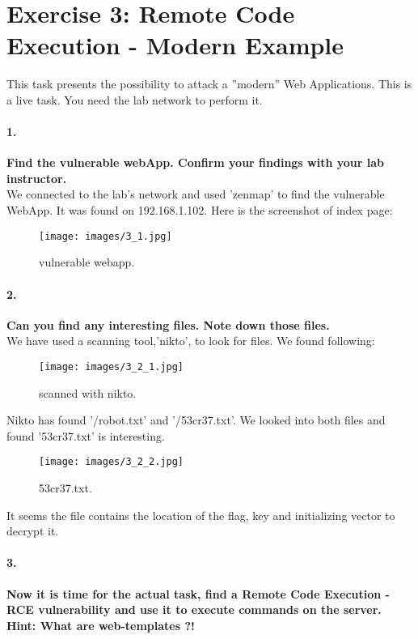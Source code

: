 \documentclass[12pt]{report}
\begin{document}
	
	\section*{Exercise 3: Remote Code Execution - Modern Example}
	
	This task presents the possibility to attack a ''modern'' Web Applications. This is a live task. You need the lab	network to perform it.
	
	\paragraph*{1.}{\bf Find the vulnerable webApp. Confirm your findings with your lab instructor.}\\
	
	We connected to the lab's network and used 'zenmap' to find the vulnerable WebApp. It was found on 192.168.1.102. Here is the screenshot of index page:
	
	\begin{figure}[H]
		\texttt{[image: images/3\_1.jpg]}
		\caption{vulnerable webapp.}
	\end{figure}
	
	\paragraph*{2.}{\bf Can you find any interesting files. Note down those files.}\\
	
	We have used a scanning tool,'nikto', to look for files. We found following:
	
	\begin{figure}[H]
		\texttt{[image: images/3\_2\_1.jpg]}
		\caption{scanned with nikto.}
	\end{figure}
	
	Nikto has found '/robot.txt' and '/53cr37.txt'. We looked into both files and found '53cr37.txt' is interesting.
	\begin{figure}[H]
		\texttt{[image: images/3\_2\_2.jpg]}
		\caption{53cr37.txt.}
	\end{figure}
	It seems the file contains the location of the flag, key and initializing vector to decrypt it.
	
	\paragraph*{3.}{\bf Now it is time for the actual task, find a Remote Code Execution - RCE vulnerability and use it to execute commands on the server.\\
		Hint: What are web-templates ?!}\\
	
\end{document}

